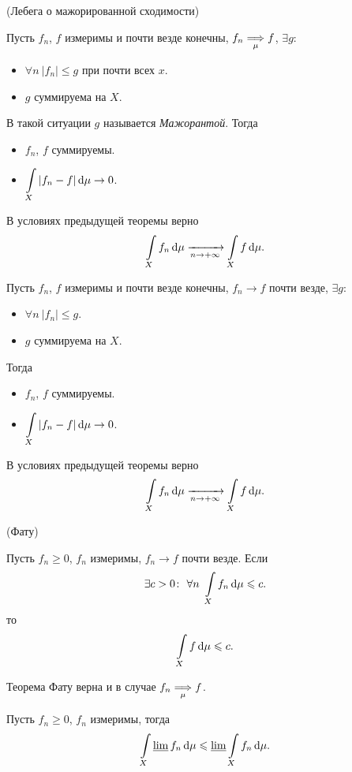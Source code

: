\begin{theorem}(Лебега о мажорированной сходимости)
    
    Пусть $f_n$, $f$ измеримы и почти везде конечны, $f_n \underset{\mu}{\Longrightarrow} f$, 
    $\exists g\colon~$
    \begin{itemize}
        \item $\forall n~ |f_n| \leqslant g$ при почти всех $x$.
        \item $g$ суммируема на $X$.
    \end{itemize} 
    В такой ситуации $g$ называется \textit{Мажорантой}. Тогда
    \begin{itemize}
        \item $f_n$, $f$ суммируемы.
        \item $\displaystyle \int\limits_{X}{|f_n - f| \,\mathrm{d}\mu} \to 0$.
    \end{itemize} 
\end{theorem}

\begin{corollary}
    
    В условиях предыдущей теоремы верно
\[
    \int\limits_{X}{f_n \,\mathrm{d}\mu} \xrightarrow[n \to +\infty]{} \int\limits_{X}{f \,\mathrm{d}\mu}
.\] 
\end{corollary}

\begin{theorem}
    Пусть $f_n$, $f$ измеримы и почти везде конечны, $f_n \to f$ почти везде,
    $\exists g\colon~$
    \begin{itemize}
        \item $\forall n~ |f_n| \leqslant g$.
        \item $g$ суммируема на $X$.
    \end{itemize}
    Тогда
    \begin{itemize}
        \item $f_n$, $f$ суммируемы.
        \item $\displaystyle \int\limits_{X}{|f_n - f| \,\mathrm{d}\mu} \to 0$.
    \end{itemize} 
\end{theorem}

\begin{corollary}
    
    В условиях предыдущей теоремы верно
\[
    \int\limits_{X}{f_n \,\mathrm{d}\mu} \xrightarrow[n \to +\infty]{} \int\limits_{X}{f \,\mathrm{d}\mu}
.\] 
\end{corollary}

\begin{theorem}(Фату)

    Пусть $f_n \geqslant 0$, $f_n$ измеримы, $f_n \to f$ почти везде. Если
\[
    \exists c > 0\colon~ \forall n~ \int\limits_{X}{f_n \,\mathrm{d}\mu} \leqslant c
.\] 
    то
\[
    \int\limits_{X}{f \,\mathrm{d}\mu} \leqslant c
.\] 
\end{theorem}

\begin{corollary}
    
    Теорема Фату верна и в случае $f_n \underset{\mu}{\Longrightarrow} f$.
\end{corollary}

\begin{corollary}
    
    Пусть $f_n \geqslant 0$, $f_n$ измеримы, тогда
\[
    \int\limits_{X}{\varliminf{f_n} \,\mathrm{d}\mu} \leqslant \varliminf{\int\limits_{X}{f_n \,\mathrm{d}\mu}}
.\] 
\end{corollary}
